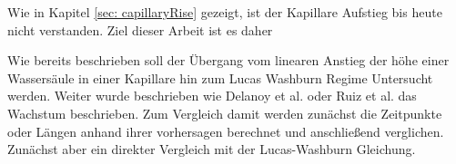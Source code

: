 

Wie in Kapitel \ref{sec: capillaryRise} gezeigt, ist der Kapillare Aufstieg bis heute nicht verstanden. Ziel dieser Arbeit ist es daher 


Wie bereits beschrieben soll der Übergang vom linearen Anstieg der höhe einer Wassersäule in einer Kapillare hin zum Lucas Washburn Regime Untersucht werden. Weiter wurde beschrieben wie Delanoy et al. \cite{delannoy2019DualRoleViscosity} oder Ruiz et al. \cite{ruiz-gutierrez2022LongCrossoverDynamics} das Wachstum beschrieben. Zum Vergleich damit werden zunächst die Zeitpunkte oder Längen anhand ihrer vorhersagen berechnet und anschließend verglichen. Zunächst aber ein direkter Vergleich mit der Lucas-Washburn Gleichung. 